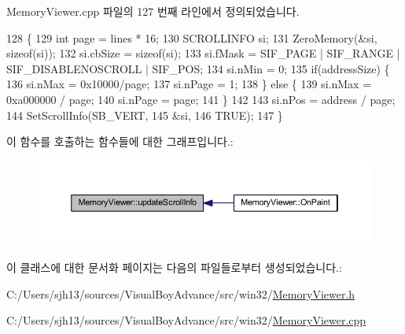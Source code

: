 Memory\+Viewer.\+cpp 파일의 127 번째 라인에서 정의되었습니다.


\begin{DoxyCode}
128 \{
129   \textcolor{keywordtype}{int} page = lines * 16;
130   SCROLLINFO si;
131   ZeroMemory(&si, \textcolor{keyword}{sizeof}(si));
132   si.cbSize = \textcolor{keyword}{sizeof}(si);
133   si.fMask = SIF\_PAGE | SIF\_RANGE | SIF\_DISABLENOSCROLL | SIF\_POS;
134   si.nMin = 0;
135   \textcolor{keywordflow}{if}(addressSize) \{
136     si.nMax = 0x10000/page;
137     si.nPage = 1;
138   \} \textcolor{keywordflow}{else} \{
139     si.nMax = 0xa000000 / page;
140     si.nPage = page;
141   \}
142 
143   si.nPos = address / page;
144   SetScrollInfo(SB\_VERT,
145                 &si,
146                 TRUE);
147 \}
\end{DoxyCode}
이 함수를 호출하는 함수들에 대한 그래프입니다.\+:
\nopagebreak
\begin{figure}[H]
\begin{center}
\leavevmode
\includegraphics[width=350pt]{class_memory_viewer_aa133e5db4bf989efa18892de371c0f43_icgraph}
\end{center}
\end{figure}


이 클래스에 대한 문서화 페이지는 다음의 파일들로부터 생성되었습니다.\+:\begin{DoxyCompactItemize}
\item 
C\+:/\+Users/sjh13/sources/\+Visual\+Boy\+Advance/src/win32/\mbox{\hyperlink{_memory_viewer_8h}{Memory\+Viewer.\+h}}\item 
C\+:/\+Users/sjh13/sources/\+Visual\+Boy\+Advance/src/win32/\mbox{\hyperlink{_memory_viewer_8cpp}{Memory\+Viewer.\+cpp}}\end{DoxyCompactItemize}

